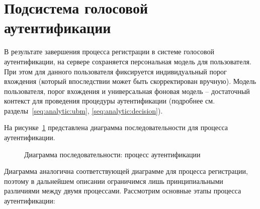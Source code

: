 \section{Подсистема голосовой аутентификации}

В результате завершения процесса регистрации в системе голосовой аутентификации,
на сервере сохраняется персональная модель для пользователя. При этом для
данного пользователя фиксируется индивидуальный порог вхождения (который
впоследствии может быть скорректирован вручную). Модель пользователя, порог
вхождения и универсальная фоновая модель -- достаточный контекст для проведения
процедуры аутентификации (подробнее см. разделы~\ref{seq:analytic:ubm},
\ref{seq:analytic:decision}).

На рисунке~\ref{fig:seq_verification} представлена диаграмма последовательности
для процесса аутентификации.

\begin{figure}[htp!]
    \center{
        \fontsize{12}{14}\selectfont
        
    }
    \caption{Диаграмма последовательности: процесс аутентификации}
    \label{fig:seq_verification}
\end{figure}

Диаграмма аналогична соответствующей диаграмме для процесса регистрации, поэтому
в дальнейшем описании ограничимся лишь принципиальными различиями между двумя
процессами. Рассмотрим основные этапы процесса аутентификации:

